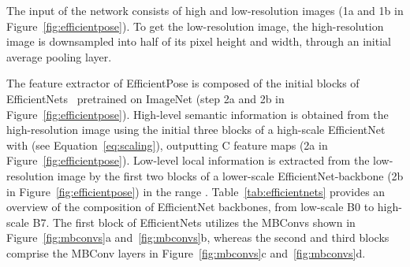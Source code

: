 The input of the network consists of high and low-resolution images (1a and 1b in Figure~\ref{fig:efficientpose}). To get the low-resolution image, the high-resolution image is downsampled into half of its pixel height and width, through an initial average pooling layer. 

The feature extractor of EfficientPose is composed of the initial blocks of EfficientNets~\cite{tan2019efficientnet} pretrained on ImageNet (step 2a and 2b in Figure~\ref{fig:efficientpose}). High-level semantic information is obtained from the high-resolution image using the initial three blocks of a high-scale EfficientNet with  (see Equation~\ref{eq:scaling}), outputting C feature maps (2a in Figure~\ref{fig:efficientpose}). Low-level local information is extracted from the low-resolution image by the first two blocks of a lower-scale EfficientNet-backbone (2b in Figure~\ref{fig:efficientpose}) in the range . Table~\ref{tab:efficientnets} provides an overview of the composition of EfficientNet backbones, from low-scale B0 to high-scale B7. The first block of EfficientNets utilizes the MBConvs shown in Figure~\ref{fig:mbconvs}a and~\ref{fig:mbconvs}b, whereas the second and third blocks comprise the MBConv layers in Figure~\ref{fig:mbconvs}c and~\ref{fig:mbconvs}d. 

